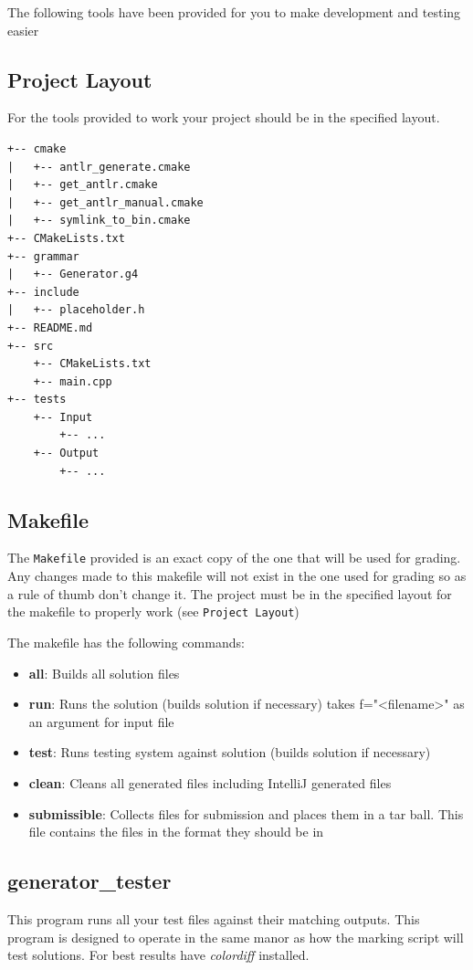 \documentclass{article}
\begin{document}
The following tools have been provided for you to make development and testing easier

\subsection{Project Layout}
For the tools provided to work your project should be in the specified layout.

\begin{lstlisting}
+-- cmake
|   +-- antlr_generate.cmake
|   +-- get_antlr.cmake
|   +-- get_antlr_manual.cmake
|   +-- symlink_to_bin.cmake
+-- CMakeLists.txt
+-- grammar
|   +-- Generator.g4
+-- include
|   +-- placeholder.h
+-- README.md
+-- src
    +-- CMakeLists.txt
    +-- main.cpp
+-- tests
    +-- Input
        +-- ...
    +-- Output
        +-- ...
\end{lstlisting}


\subsection{Makefile}
The \texttt{Makefile} provided is an exact copy of the one that will be used for grading.  Any changes made to
this makefile will not exist in the one used for grading so as a rule of thumb don't change it. The project must
be in the specified layout for the makefile to properly work (see \texttt{Project Layout})

The makefile has the following commands:
\begin{itemize}
  \item{\textbf{all}}: Builds all solution files
  \item{\textbf{run}}: Runs the solution (builds solution if necessary) takes f="<filename>" as an argument for
    input file
  \item{\textbf{test}}: Runs testing system against solution (builds solution if necessary)
  \item{\textbf{clean}}: Cleans all generated files including IntelliJ generated files
  \item{\textbf{submissible}}: Collects files for submission and places them in a tar ball. This file contains
  the files in the format they should be in
\end{itemize}

\subsection{generator\_tester}
This program runs all your test files against their matching outputs. This program is designed to operate in the
same manor as how the marking script will test solutions. For best results have \textit{colordiff} installed.
\end{document}
